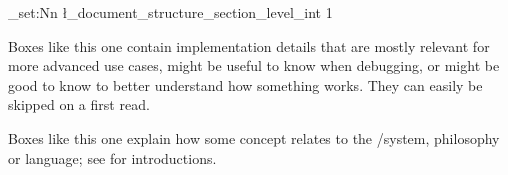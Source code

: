 \ExplSyntaxOn
\int_set:Nn \l_document_structure_section_level_int {1}
\ExplSyntaxOff

\clearpage

{%
  \def\\{:}%
  \tableofcontents
}

\clearpage
{}
	
\fi

\long{}

\begin{dangerbox}
  Boxes like this one contain implementation details that are
  mostly relevant for more advanced use cases, might be useful 
  to know when debugging, or might be good to know to better understand
  how something works. They can easily be skipped on a first read.
\end{dangerbox}

\begin{mmtbox}
  Boxes like this one explain how some \sTeX concept relates to the \mmt/\omdoc system,
  philosophy or language; see \cite{uniformal:on,Kohlhase:OMDoc1.2} for introductions.
\end{mmtbox}


